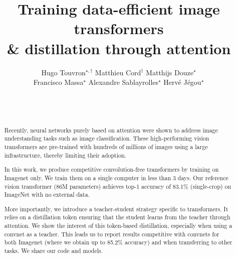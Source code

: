 \documentclass{article}
\title{Training data-efficient image transformers \\ \& distillation through attention}
\author{
\begin{minipage}{\linewidth}
\begin{center}
\large Hugo Touvron$^{\star,\dagger}$ \hspace{0.23cm} Matthieu Cord$^{\dagger}$ \hspace{0.23cm} Matthijs Douze$^{\star}$ \\[0.2cm] 
%
Francisco Massa$^{\star}$ \hspace{0.23cm}
Alexandre Sablayrolles$^{\star}$ \hspace{0.23cm}  Herv\'e J\'egou$^{\star}$ \\[0.5cm]
\scalebox{1.}{$^\star$Facebook AI\hspace{0.6cm} $^\dagger$Sorbonne University}\\[1cm]
\end{center}
\end{minipage}
}
\date{~}
\begin{document}
\maketitle

\begin{abstract}
Recently, neural networks purely based on attention were shown to address image understanding tasks such as image classification. These high-performing vision transformers are pre-trained with hundreds of millions of images using a large infrastructure, thereby limiting their adoption. 

In this work, we produce competitive convolution-free transformers by training on Imagenet only. We train them on a single computer in less than 3 days.
Our reference vision transformer (86M parameters) achieves top-1 accuracy of 83.1\% (single-crop) on ImageNet with no external data.  

More importantly, we introduce a teacher-student strategy specific to  transformers. It relies on a distillation token ensuring that the student learns from the teacher 
through attention. %
%
%
We show the interest of this token-based distillation, especially when using a convnet as a teacher. This leads us to report results competitive with convnets for both Imagenet (where we obtain up to 85.2\% accuracy) and when transferring to other tasks. We share our code and models. %
\end{abstract}





 



\clearpage

{\small


}
\end{document}
